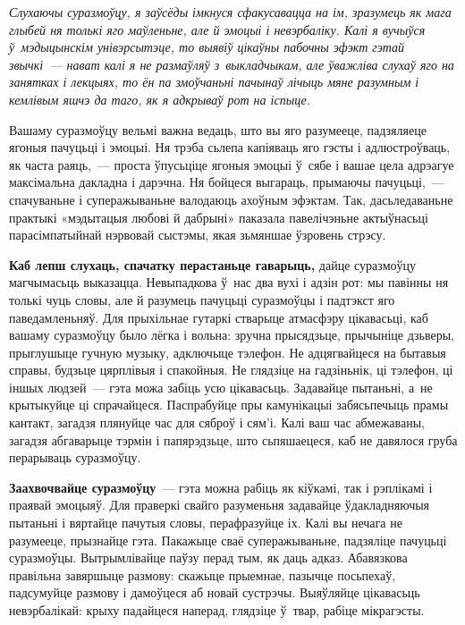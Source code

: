 
\emph{Слухаючы суразмоўцу, я заўсёды імкнуся сфакусавацца на ім, зразумець як мага глыбей ня толькі яго маўленьне, але й эмоцыі і невэрбаліку. Калі я вучыўся ў~мэдыцынскім унівэрсытэце, то выявіў цікаўны пабочны эфэкт гэтай звычкі~--- нават калі я не размаўляў з~выкладчыкам, але ўважліва слухаў яго на занятках і лекцыях, то ён па змоўчаньні пачынаў лічыць мяне разумным і кемлівым яшчэ да таго, як я адкрываў рот на іспыце.}

Вашаму суразмоўцу вельмі важна ведаць, што вы яго разумееце, падзяляеце ягоныя пачуцьці і эмоцыі. Ня трэба сьлепа капіяваць яго гэсты і адлюстроўваць, як часта раяць,~--- проста ўпусьціце ягоныя эмоцыі ў~сябе і вашае цела адрэагуе максімальна дакладна і дарэчна. Ня бойцеся выгараць, прымаючы пачуцьці,~--- спачуваньне і суперажываньне валодаюць ахоўным эфэктам. Так, дасьледаваньне практыкі «мэдытацыя любові й дабрыні» паказала павелічэньне актыўнасьці парасімпатыйнай нэрвовай сыстэмы, якая зьмяншае ўзровень стрэсу.

\textbf{Каб лепш слухаць, спачатку перастаньце гаварыць,} дайце суразмоўцу магчымасьць выказацца. Невыпадкова ў~нас два вухі і адзін рот: мы павінны ня толькі чуць словы, але й разумець пачуцьці суразмоўцы і падтэкст яго паведамленьняў. Для прыхільнае гутаркі стварыце атмасфэру цікавасьці, каб вашаму суразмоўцу было лёгка і вольна: зручна прысядзьце, прычыніце дзьверы, прыглушыце гучную музыку, адключыце тэлефон. Не адцягвайцеся на бытавыя справы, будзьце цярплівыя і спакойныя. Не глядзіце на гадзіньнік, ці тэлефон, ці іншых людзей~--- гэта можа забіць усю цікавасьць. Задавайце пытаньні, а~не крытыкуйце ці спрачайцеся. Паспрабуйце пры камунікацыі забясьпечыць прамы кантакт, загадзя плянуйце час для сяброў і сям'і. Калі ваш час абмежаваны, загадзя абгаварыце тэрмін і папярэдзьце, што сьпяшаецеся, каб не давялося груба перарываць суразмоўцу.

\textbf{Заахвочвайце суразмоўцу}~--- гэта можна рабіць як кіўкамі, так і рэплікамі і праявай эмоцыяў. Для праверкі свайго разуменьня задавайце ўдакладняючыя пытаньні і вяртайце пачутыя словы, перафразуйце іх. Калі вы нечага не разумееце, прызнайце гэта. Пакажыце сваё суперажываньне, падзяліце пачуцьці суразмоўцы. Вытрымлівайце паўзу перад тым, як даць адказ. Абавязкова правільна завяршыце размову: скажыце прыемнае, пазычце посьпехаў, падсумуйце размову і дамоўцеся аб новай сустрэчы. Выяўляйце цікавасьць невэрбалікай: крыху падайцеся наперад, глядзіце ў~твар, рабіце мікрагэсты.

